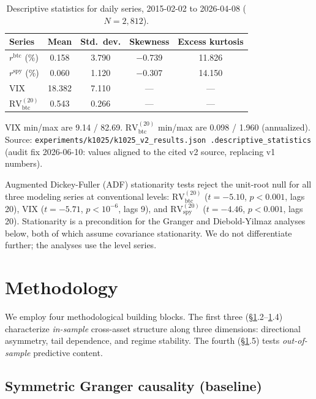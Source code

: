\documentclass[11pt,a4paper]{article}
\begin{document}
\begin{table}[H]
\centering
\caption{Descriptive statistics for daily series, 2015-02-02 to 2026-04-08 ($N = 2{,}812$).}
\label{tab:descriptive}
\begin{tabular}{lcccc}
\toprule
Series & Mean & Std.\ dev. & Skewness & Excess kurtosis \\
\midrule
$r^{\text{btc}}$ (\%) & 0.158 & 3.790 & $-$0.739 & 11.826 \\
$r^{\text{spy}}$ (\%) & 0.060 & 1.120 & $-$0.307 & 14.150 \\
VIX & 18.382 & 7.110 & --- & --- \\
$\text{RV}^{(20)}_{\text{btc}}$ & 0.543 & 0.266 & --- & --- \\
\bottomrule
\end{tabular}
\begin{flushleft}
\footnotesize VIX min/max are 9.14 / 82.69. $\text{RV}^{(20)}_{\text{btc}}$ min/max are 0.098 / 1.960 (annualized). Source: \texttt{experiments/k1025/k1025\_v2\_results.json .descriptive\_statistics} (audit fix 2026-06-10: values aligned to the cited v2 source, replacing v1 numbers).
\end{flushleft}
\end{table}

Augmented Dickey-Fuller (ADF) stationarity tests reject the unit-root null for all three modeling series at conventional levels: $\text{RV}^{(20)}_{\text{btc}}$ ($t = -5.10$, $p < 0.001$, lags 20), VIX ($t = -5.71$, $p < 10^{-6}$, lags 9), and $\text{RV}^{(20)}_{\text{spy}}$ ($t = -4.46$, $p < 0.001$, lags 20).%
 Stationarity is a precondition for the Granger and Diebold-Yilmaz analyses below, both of which assume covariance stationarity. We do not differentiate further; the analyses use the level series.

\section{Methodology}
\label{sec:methodology}

We employ four methodological building blocks. The first three (\S\ref{sec:methodology}.2--\ref{sec:methodology}.4) characterize \emph{in-sample} cross-asset structure along three dimensions: directional asymmetry, tail dependence, and regime stability. The fourth (\S\ref{sec:methodology}.5) tests \emph{out-of-sample} predictive content.

\subsection{Symmetric Granger causality (baseline)}
\label{subsec:granger_sym}
\end{document}
